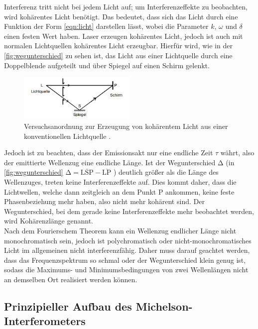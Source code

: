 \noindent
Interferenz tritt nicht bei jedem Licht auf; um Interferenzeffekte zu beobachten, wird kohärentes Licht benötigt. Das bedeutet, dass sich das Licht durch eine Funktion der Form \eqref{eqn:licht}
darstellen lässt, wobei die Parameter $k$, $\omega$ und $\delta$ einen festen Wert haben. Laser erzeugen kohärentes Licht, jedoch ist auch mit normalen Lichtquellen kohärentes Licht
erzeugbar. Hierfür wird, wie in der \autoref{fig:wegunterschied} zu sehen ist, das Licht aus einer Lichtquelle durch eine Doppelblende aufgeteilt und über Spiegel auf einen Schirm
gelenkt. 

\begin{figure}
    \centering
    \includegraphics[width=0.5\textwidth]{content/wegunterschied.jpg}
    \caption{Versuchsanordnung zur Erzeugung von kohärentem Licht aus einer konventionellen Lichtquelle \cite{anleitung}.}
    \label{fig:wegunterschied}
\end{figure}

\noindent
Jedoch ist zu beachten, dass der Emissionsakt nur eine endliche Zeit $\tau$ währt, also der emittierte Wellenzug eine endliche Länge. Ist der Wegunterschied $\increment $ (in \autoref{fig:wegunterschied}
$\increment = \overline{\text{LSP}} - \overline{\text{LP}} $ ) deutlich größer als die Länge des Wellenzuges, treten keine Interferenzeffekte auf. Dies kommt daher, dass die Lichtwellen,
welche dann zeitgleich an dem Punkt P ankommen, keine feste Phasenbeziehung mehr haben, also nicht mehr kohärent sind. Der Wegunterschied, bei dem gerade keine Interferenzeffekte mehr 
beobachtet werden, wird Kohärenzlänge genannt.\\
Nach dem Fourierschem Theorem kann ein Wellenzug endlicher Länge nicht monochromatisch sein, jedoch ist polychromatisch oder nicht-monochromatisches Licht im allgemeinen nicht 
interferenzfähig. Daher muss darauf geachtet werden, dass das Frequenzspektrum so schmal oder der Wegunterschied klein genug ist, sodass die Maximums- und Minimumsbedingungen von zwei
Wellenlängen nicht an demselben Ort realisiert werden können.


\subsection{Prinzipieller Aufbau des Michelson-Interferometers}

